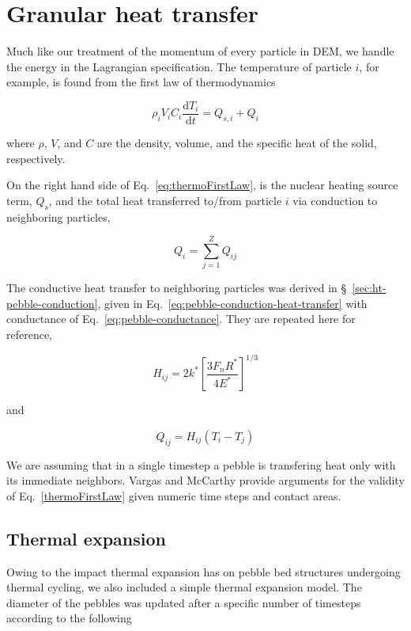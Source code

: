 \section{Granular heat transfer}

Much like our treatment of the momentum of every particle in DEM, we handle the energy in the Lagrangian specification. The temperature of particle $i$, for example, is found from the first law of thermodynamics

\begin{equation}\label{eq:thermoFirstLaw}
	\rho_iV_iC_i\frac{\mathrm{d}T_i}{\mathrm{d}t} = Q_{s,i} + Q_{i}
\end{equation}

where $\rho$, $V$, and $C$ are the density, volume, and the specific heat of the solid, respectively. 

On the right hand side of Eq.~\ref{eq:thermoFirstLaw}, is the nuclear heating source term, $Q_{s}$, and the total heat transferred to/from particle $i$ via conduction to neighboring particles,

\begin{equation}
	Q_i = \sum_{j=1}^Z Q_{ij}
\end{equation}

The conductive heat transfer to neighboring particles was derived in \S~\ref{sec:ht-pebble-conduction}, given in Eq.~\ref{eq:pebble-conduction-heat-transfer} with conductance of Eq.~\ref{eq:pebble-conductance}. They are repeated here for reference,

\begin{equation*}
	H_{ij}= 2k^*\left[\frac{3F_nR^*}{4E^*}\right]^{1/3}
\end{equation*}

and

\begin{equation*}
	Q_{ij} = H_{ij}(T_i - T_j)
\end{equation*} 

We are assuming that in a single timestep a pebble is transfering heat only with its immediate neighbors. Vargas and McCarthy\cite{Vargas2001} provide arguments for the validity of Eq.~\ref{thermoFirstLaw} given numeric time steps and contact areas.


\subsection{Thermal expansion}
Owing to the impact thermal expansion has on pebble bed structures undergoing thermal cycling\cite{Tanigawa:2010cr, Vargas2007, Chen2009}, we also included a simple thermal expansion model.  The diameter of the pebbles was updated after a specific number of timesteps according to the following

